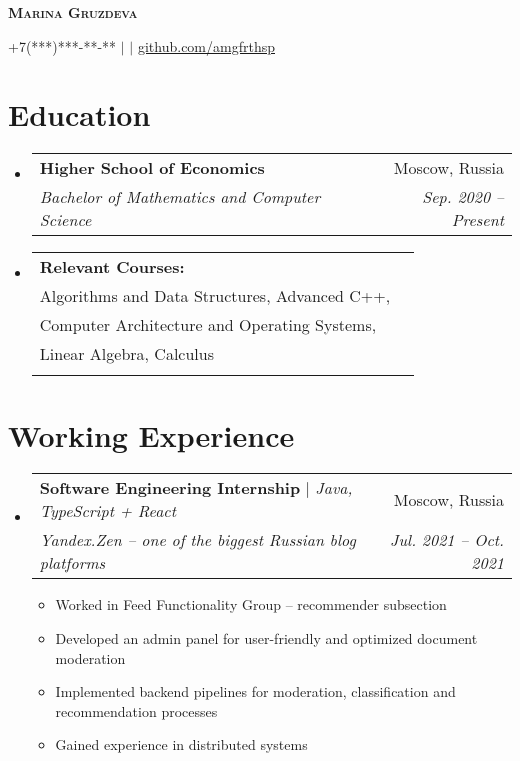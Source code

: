 \documentclass[letterpaper,11pt]{article}
\makeatletter
\newcommand{\resumeItem}[1]{
  \item\small{
    {#1 \vspace{-2pt}}
  }
}
\newcommand{\resumeSubheading}[4]{
  \vspace{-2pt}\item
    \begin{tabular*}{0.97\textwidth}[t]{l@{\extracolsep{\fill}}r}
      #1 & #2 \\
      \textit{\small#3} & \textit{\small #4} \\
    \end{tabular*}\vspace{-7pt}
}
\newcommand{\resumeSubHeadingListStart}{\begin{itemize}[leftmargin=0.15in, label={}]}
\newcommand{\resumeSubHeadingListEnd}{\end{itemize}}
\newcommand{\resumeItemListStart}{\begin{itemize}}
\newcommand{\resumeItemListEnd}{\end{itemize}\vspace{-5pt}}
\makeatother
\begin{document}

\begin{center}
    \textbf{\Huge \scshape Marina Gruzdeva} \\ \vspace{15pt}

    \small +7(***)***-**-** $|$ \href{mailto:}{\underline{}} $|$ 
    \href{https://github.com/amgfrthsp}{\underline{github.com/amgfrthsp}}
\end{center}


\section{Education}
  \resumeSubHeadingListStart
    \resumeSubheading
      {\textbf{Higher School of Economics}}{Moscow, Russia}
      {Bachelor of Mathematics and Computer Science}{Sep. 2020 -- Present}
    \resumeSubheading
      {\textbf{Relevant Courses:}\\ Algorithms and Data Structures, Advanced C++,\\ Computer Architecture and Operating Systems,\\ Linear Algebra, Calculus}{}{}{}
  \resumeSubHeadingListEnd


\section{Working Experience}
  \resumeSubHeadingListStart

    \resumeSubheading
      {\textbf{Software Engineering Internship} $|$ \emph{Java, TypeScript + React}}
      {Moscow, Russia}
      {Yandex.Zen -- one of the biggest Russian blog platforms}
      {Jul. 2021 -- Oct. 2021}
      \resumeItemListStart
        \resumeItem{Worked in Feed Functionality Group -- recommender subsection}
        \resumeItem{Developed an admin panel for user-friendly and optimized document moderation}
        \resumeItem{Implemented backend pipelines for moderation, classification and recommendation processes}
        \resumeItem{Gained experience in distributed systems}
      \resumeItemListEnd
   \resumeSubHeadingListEnd
\end{document}
